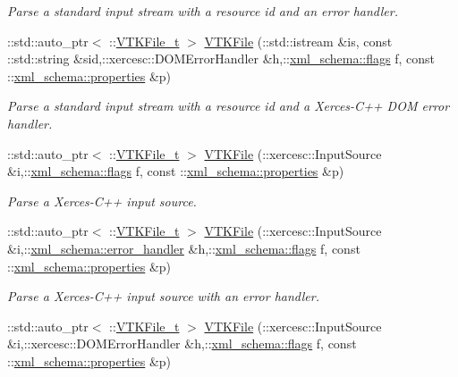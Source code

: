 \begin{DoxyCompactItemize}
\begin{DoxyCompactList}\small\item\em Parse a standard input stream with a resource id and an error handler. \end{DoxyCompactList}\item 
\-::std\-::auto\-\_\-ptr$<$ \-::\hyperlink{classVTKFile__t}{V\-T\-K\-File\-\_\-t} $>$ \hyperlink{vtk-unstructured_8cpp_a814cb20ccb515a7b632f0c321294e689}{V\-T\-K\-File} (\-::std\-::istream \&is, const \-::std\-::string \&sid,\-::xercesc\-::\-D\-O\-M\-Error\-Handler \&h,\-::\hyperlink{namespacexml__schema_a8d981c127a1f5106d04ad5853e707361}{xml\-\_\-schema\-::flags} f, const \-::\hyperlink{namespacexml__schema_aba199bc39c8b21c427369c27d2bcfc8c}{xml\-\_\-schema\-::properties} \&p)
\begin{DoxyCompactList}\small\item\em Parse a standard input stream with a resource id and a Xerces-\/\-C++ D\-O\-M error handler. \end{DoxyCompactList}\item 
\-::std\-::auto\-\_\-ptr$<$ \-::\hyperlink{classVTKFile__t}{V\-T\-K\-File\-\_\-t} $>$ \hyperlink{vtk-unstructured_8cpp_a5fced37b23830aa750d1b8d2c961ddd4}{V\-T\-K\-File} (\-::xercesc\-::\-Input\-Source \&i,\-::\hyperlink{namespacexml__schema_a8d981c127a1f5106d04ad5853e707361}{xml\-\_\-schema\-::flags} f, const \-::\hyperlink{namespacexml__schema_aba199bc39c8b21c427369c27d2bcfc8c}{xml\-\_\-schema\-::properties} \&p)
\begin{DoxyCompactList}\small\item\em Parse a Xerces-\/\-C++ input source. \end{DoxyCompactList}\item 
\-::std\-::auto\-\_\-ptr$<$ \-::\hyperlink{classVTKFile__t}{V\-T\-K\-File\-\_\-t} $>$ \hyperlink{vtk-unstructured_8cpp_adf4d4d420188c2ec3cf7ecf194c0db9a}{V\-T\-K\-File} (\-::xercesc\-::\-Input\-Source \&i,\-::\hyperlink{namespacexml__schema_abdee01986b8e16f04af47dd12038261e}{xml\-\_\-schema\-::error\-\_\-handler} \&h,\-::\hyperlink{namespacexml__schema_a8d981c127a1f5106d04ad5853e707361}{xml\-\_\-schema\-::flags} f, const \-::\hyperlink{namespacexml__schema_aba199bc39c8b21c427369c27d2bcfc8c}{xml\-\_\-schema\-::properties} \&p)
\begin{DoxyCompactList}\small\item\em Parse a Xerces-\/\-C++ input source with an error handler. \end{DoxyCompactList}\item 
\-::std\-::auto\-\_\-ptr$<$ \-::\hyperlink{classVTKFile__t}{V\-T\-K\-File\-\_\-t} $>$ \hyperlink{vtk-unstructured_8cpp_a05320585fc9be971c331447b76c0d14b}{V\-T\-K\-File} (\-::xercesc\-::\-Input\-Source \&i,\-::xercesc\-::\-D\-O\-M\-Error\-Handler \&h,\-::\hyperlink{namespacexml__schema_a8d981c127a1f5106d04ad5853e707361}{xml\-\_\-schema\-::flags} f, const \-::\hyperlink{namespacexml__schema_aba199bc39c8b21c427369c27d2bcfc8c}{xml\-\_\-schema\-::properties} \&p)

\end{DoxyCompactItemize}

